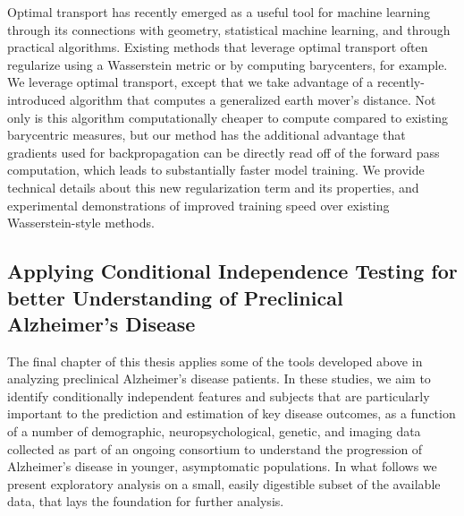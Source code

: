 Optimal transport has recently emerged as a useful tool for machine learning through its connections with geometry, statistical machine learning, and through practical algorithms. Existing methods that leverage optimal transport often  regularize using  a Wasserstein metric or by computing barycenters, for example. %
We leverage optimal transport, except that we take advantage of a recently-introduced algorithm that computes a generalized earth mover's distance.
Not only is this algorithm computationally cheaper to compute compared to existing barycentric measures, but our method has the additional  advantage that gradients used for backpropagation can be directly read off of the forward pass computation, which leads to substantially faster model training.
We provide technical details about this new regularization term and its properties, 
and 
experimental demonstrations of improved training speed over existing Wasserstein-style methods.

{\color{red}
\subsection{Applying Conditional Independence Testing for better Understanding of Preclinical Alzheimer's Disease}

The final chapter of this thesis applies some of the tools developed above in analyzing preclinical Alzheimer's disease patients. 
In these studies, 
we aim to identify conditionally independent features and subjects that are particularly important to the prediction and estimation of
key disease outcomes,
as a function of a number 
of demographic, neuropsychological,
genetic,
and imaging data collected as 
part of an ongoing consortium 
to understand the progression
of Alzheimer's disease in younger, 
asymptomatic populations.
In what follows we present
exploratory analysis
on a small, easily 
digestible subset of the available data,
that lays the foundation for
further analysis.
}

